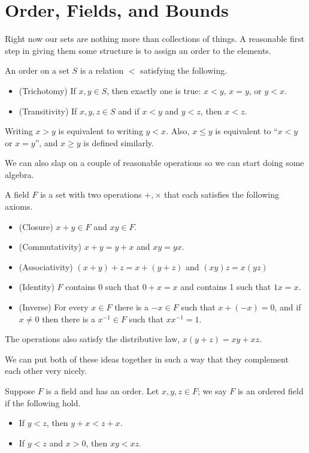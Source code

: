 \documentclass[../m131main.tex]{subfiles}
\begin{document}
\section{Order, Fields, and Bounds}
Right now our sets are nothing more than collections of things.
A reasonable first step in giving them some structure is to assign an order to the elements.

\begin{definition}[Order]
    An order on a set $S$ is a relation $<$ satisfying the following.
    \begin{itemize}
        \item (Trichotomy) If $x,y \in S$, then exactly one is true: $x < y$, $x = y$, or $y < x$.
        \item (Transitivity) If $x,y,z \in S$ and if $x < y$ and $y < z$, then $x < z$.
    \end{itemize}
    Writing $x > y$ is equivalent to writing $y < x$.
    Also, $x \leq y$ is equivalent to ``$x < y$ or $x = y$'', and $x \geq y$ is defined similarly.
\end{definition}

We can also slap on a couple of reasonable operations so we can start doing some algebra.

\begin{definition}[Field]
    A field $F$ is a set with two operations $+,\times$ that each satisfies the following axioms.
    \begin{itemize}
        \item (Closure) $x + y \in F$ and $xy \in F$.
        \item (Commutativity) $x + y = y + x$ and $xy = yx$.
        \item (Associativity) $(x + y) + z = x + (y + z)$ and $(xy)z = x(yz)$
        \item (Identity) $F$ contains 0 such that $0 + x = x$ and contains 1 such that $1x = x$.
        \item (Inverse) For every $x \in F$ there is a $-x \in F$ such that $x + (-x) = 0$, and if $x \neq 0$ then there is a $x^{-1} \in F$ such that $x x^{-1} = 1$.
    \end{itemize}
    The operations also satisfy the distributive law, $x(y + z) = xy + xz$.
\end{definition}

We can put both of these ideas together in such a way that they complement each other very nicely.

\begin{definition}
    Suppose $F$ is a field and has an order.
    Let $x,y,z \in F$;
    we say $F$ is an ordered field if the following hold.
    \begin{itemize}
        \item If $y < z$, then $y + x < z + x$.
        \item If $y < z$ and $x > 0$, then $xy < xz$.   
    \end{itemize}
\end{definition}
\end{document}
